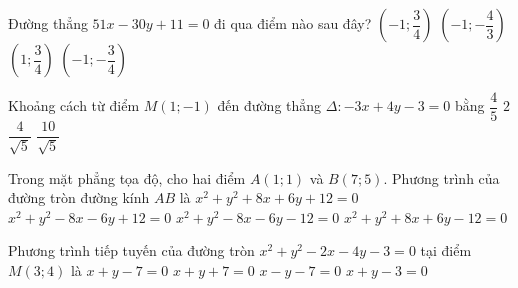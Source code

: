 \begin{ex}%
	Đường thẳng $51x-30y+11=0$ đi qua điểm nào sau đây?
	\choice
	{$\left(-1;\dfrac{3}{4} \right) $}
	{\True $\left(-1;-\dfrac{4}{3} \right) $}
	{$\left(1;\dfrac{3}{4} \right) $}
	{$\left(-1;-\dfrac{3}{4} \right) $}
\end{ex}

\begin{ex}%
	Khoảng cách từ điểm $M(1;-1)$ đến đường thẳng $\Delta : -3x+4y-3=0$ bằng
	\choice
	{$\dfrac{4}{5}$}
	{\True $2$}
	{$\dfrac{4}{\sqrt{5}}$}
	{$\dfrac{10}{\sqrt{5}}$}
\end{ex}

\begin{ex}%
	Trong mặt phẳng tọa độ, cho hai điểm $A(1;1)$ và $B(7;5)$. Phương trình của đường tròn đường kính $AB$ là
	\choice
	{$x^2+y^2+8x+6y+12=0$}
	{\True $x^2+y^2-8x-6y+12=0$}
	{$x^2+y^2-8x-6y-12=0$}
	{$x^2+y^2+8x+6y-12=0$}
\end{ex}

\begin{ex}%
	Phương trình tiếp tuyến của đường tròn $x^2+y^2-2x-4y-3=0$ tại điểm $M(3;4)$ là
	\choice
	{\True $x+y-7=0$}
	{$x+y+7=0$}
	{$x-y-7=0$}
	{$x+y-3=0$}
\end{ex}
  

